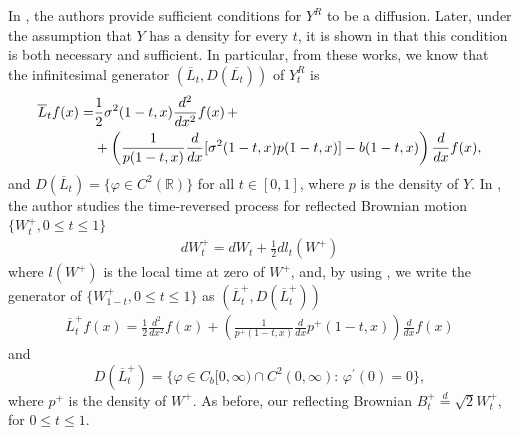 \documentclass[11pt,a4paper]{article}
\theoremstyle{definition}
\theoremstyle{remark}
\begin{document}
In \cite{reverse-diffusion1}, the authors provide sufficient conditions for \({Y}^R\) to be a diffusion. Later, under the assumption that \(Y\) has a density for every \(t\), it is shown in \cite{reverse-diffusion2} that this condition is both necessary and sufficient. In particular, from these works, we know that the infinitesimal generator \((\overline{L}_t, {D}(\overline{L_t}))\) of \({Y}_t^R\) is  
\begin{align}
	\label{Lsegnato}
	\overline{L}_t f (x)= &\frac{1}{2} \sigma^2(1-t,x) \frac{d^2}{dx^2} f(x) \,+\notag \\
	&+\left(\frac{1}{p(1-t,x)} \frac{d}{dx} [\sigma^2(1-t,x) p(1-t,x)] - b(1-t,x)\right) \frac{d}{dx} f(x),
\end{align}
and \({D}(\overline{L}_t)=\big\{\varphi \in C^2(\mathbb{R}) \big\}\) for all \(t \in [0,1]\), where \(p\) is the density of \(Y\). In \cite{reverse-reflected}, the author studies the time-reversed process for reflected Brownian motion \mbox{$\{W^+_t, 0 \leq t \leq 1\}$}
\begin{align*}
	dW^+_t= dW_t + \frac{1}{2} dl_t(W^+)
\end{align*}
where \(l(W^+)\) is the local time at zero of \(W^+\), and, by using \cite[Lemma 2.1]{reverse-reflected}, we write the generator of \(\{W^+_{1-t}, 0 \leq t \leq 1\}\) as \((\overline{L}^+_t, {D}(\overline{L}^+_t))\)
\begin{align}
	\label{Lsegnato+}
	\overline{L}_t^+ f(x) = \frac{1}{2} \frac{d^2}{dx^2} f(x) + \left(\frac{1}{p^+(1-t,x)} \frac{d}{dx} p^+(1-t,x)\right) \frac{d}{dx} f(x)
\end{align}
and
\[
{D}(\overline{L}_t^+)=\big\{\varphi \in C_b[0,\infty) \cap C^2(0,\infty):  \, \varphi^\prime (0)=0 \big\},
\]
where \(p^+\) is the density of \(W^+\). As before, our reflecting Brownian \(B^+_t \stackrel{d}{=}\sqrt{2} W^+_t\), for \(0 \leq t \leq 1\).
\end{document}

